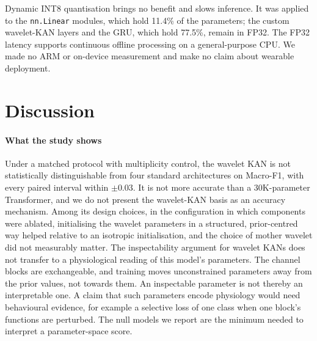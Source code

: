 \documentclass[preprint,12pt]{elsarticle}
\begin{document}
Dynamic INT8 quantisation brings no benefit and slows inference. It was applied to the \texttt{nn.Linear} modules, which hold 11.4\% of the parameters; the custom wavelet-KAN layers and the GRU, which hold 77.5\%, remain in FP32. The FP32 latency supports continuous offline processing on a general-purpose CPU. We made no ARM or on-device measurement and make no claim about wearable deployment.

\section{Discussion}
\label{sec:discussion}

\paragraph{What the study shows} Under a matched protocol with multiplicity control, the wavelet KAN is not statistically distinguishable from four standard architectures on Macro-F1, with every paired interval within $\pm0.03$. It is not more accurate than a 30K-parameter Transformer, and we do not present the wavelet-KAN basis as an accuracy mechanism. Among its design choices, in the configuration in which components were ablated, initialising the wavelet parameters in a structured, prior-centred way helped relative to an isotropic initialisation, and the choice of mother wavelet did not measurably matter. The inspectability argument for wavelet KANs does not transfer to a physiological reading of this model's parameters. The channel blocks are exchangeable, and training moves unconstrained parameters away from the prior values, not towards them. An inspectable parameter is not thereby an interpretable one. A claim that such parameters encode physiology would need behavioural evidence, for example a selective loss of one class when one block's functions are perturbed. The null models we report are the minimum needed to interpret a parameter-space score.
\end{document}
